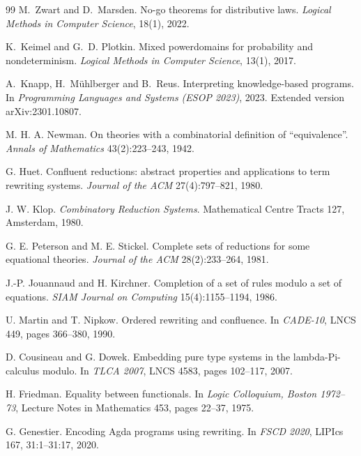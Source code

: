 \documentclass[11pt]{article}
\theoremstyle{definition}
\theoremstyle{remark}
\begin{document}
\begin{thebibliography}{99}
M.~Zwart and D.~Marsden.
\newblock No-go theorems for distributive laws.
\newblock \emph{Logical Methods in Computer Science}, 18(1), 2022.

K.~Keimel and G.~D. Plotkin.
\newblock Mixed powerdomains for probability and nondeterminism.
\newblock \emph{Logical Methods in Computer Science}, 13(1), 2017.

A.~Knapp, H.~M\"uhlberger and B.~Reus.
\newblock Interpreting knowledge-based programs.
\newblock In \emph{Programming Languages and Systems (ESOP 2023)}, 2023.
\newblock Extended version arXiv:2301.10807.

M. H. A. Newman.
\newblock On theories with a combinatorial definition of ``equivalence''.
\newblock \emph{Annals of Mathematics} 43(2):223--243, 1942.

G. Huet.
\newblock Confluent reductions: abstract properties and applications to term
  rewriting systems.
\newblock \emph{Journal of the ACM} 27(4):797--821, 1980.

J. W. Klop.
\newblock \emph{Combinatory Reduction Systems}.
\newblock Mathematical Centre Tracts 127, Amsterdam, 1980.

G. E. Peterson and M. E. Stickel.
\newblock Complete sets of reductions for some equational theories.
\newblock \emph{Journal of the ACM} 28(2):233--264, 1981.

J.-P. Jouannaud and H. Kirchner.
\newblock Completion of a set of rules modulo a set of equations.
\newblock \emph{SIAM Journal on Computing} 15(4):1155--1194, 1986.

U. Martin and T. Nipkow.
\newblock Ordered rewriting and confluence.
\newblock In \emph{CADE-10}, LNCS 449, pages 366--380, 1990.

D. Cousineau and G. Dowek.
\newblock Embedding pure type systems in the lambda-Pi-calculus modulo.
\newblock In \emph{TLCA 2007}, LNCS 4583, pages 102--117, 2007.

H. Friedman.
\newblock Equality between functionals.
\newblock In \emph{Logic Colloquium, Boston 1972--73}, Lecture Notes in
Mathematics 453, pages 22--37, 1975.

G. Genestier.
\newblock Encoding Agda programs using rewriting.
\newblock In \emph{FSCD 2020}, LIPIcs 167, 31:1--31:17, 2020.


\end{thebibliography}
\end{document}
